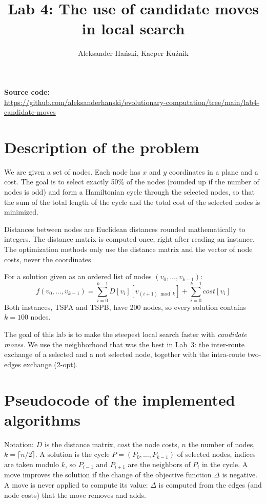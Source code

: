 \documentclass[11pt,a4paper]{article}
\title{Lab 4: The use of candidate moves in local search}
\author{Aleksander Hański, Kacper Kuźnik}
\date{}
\begin{document}
\maketitle

\textbf{Source code:}\\
\url{https://github.com/aleksanderhanski/evolutionary-computation/tree/main/lab4-candidate-moves}

\section{Description of the problem}

We are given a set of nodes. Each node has $x$ and $y$ coordinates in a plane and a cost. The goal
is to select exactly 50\% of the nodes (rounded up if the number of nodes is odd) and form a
Hamiltonian cycle through the selected nodes, so that the sum of the total length of the cycle and
the total cost of the selected nodes is minimized.

Distances between nodes are Euclidean distances rounded mathematically to integers. The distance
matrix is computed once, right after reading an instance. The optimization methods only use the
distance matrix and the vector of node costs, never the coordinates.

For a solution given as an ordered list of nodes $(v_0, \dots, v_{k-1})$:
\[
  f(v_0, \dots, v_{k-1}) = \sum_{i=0}^{k-1} D[v_i][v_{(i+1) \bmod k}] + \sum_{i=0}^{k-1} \mathit{cost}[v_i]
\]
Both instances, TSPA and TSPB, have 200 nodes, so every solution contains $k = 100$ nodes.

The goal of this lab is to make the steepest local search faster with \emph{candidate moves}. We use
the neighborhood that was the best in Lab~3: the inter-route exchange of a selected and a not
selected node, together with the intra-route two-edges exchange (2-opt).

\section{Pseudocode of the implemented algorithms}

Notation: $D$ is the distance matrix, $\mathit{cost}$ the node costs, $n$ the number of nodes,
$k = \lceil n/2 \rceil$. A solution is the cycle $P = (P_0, \dots, P_{k-1})$ of selected nodes,
indices are taken modulo $k$, so $P_{i-1}$ and $P_{i+1}$ are the neighbors of $P_i$ in the cycle.
A move improves the solution if the change of the objective function $\Delta$ is negative. A move is
never applied to compute its value: $\Delta$ is computed from the edges (and node costs) that the
move removes and adds.
\end{document}
